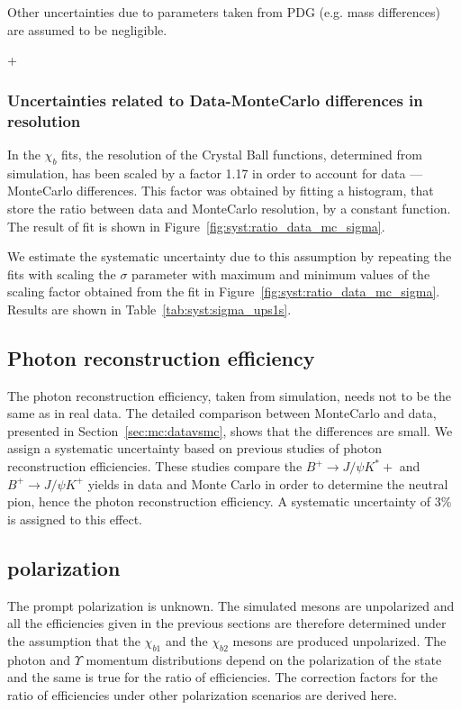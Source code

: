  Other uncertainties due to parameters taken from PDG (e.g. mass differences)
 are assumed to be negligible.
 
+\subsubsection{Uncertainties related to Data-MonteCarlo differences in resolution}
 
In the $\chi_b$ fits, the resolution of the Crystal Ball functions, determined
from simulation, has been scaled by a factor 1.17 in order to account for data
--- MonteCarlo differences. This factor was obtained by fitting a histogram,
that store the ratio between data and MonteCarlo resolution, by a constant
function. The result of fit is shown in
Figure~\ref{fig:syst:ratio_data_mc_sigma}.
 
% 


We estimate the systematic uncertainty due to this assumption by repeating the
fits with scaling the $\sigma$ parameter with maximum and minimum values of
the scaling factor obtained from the fit in Figure~\ref{fig:syst:ratio_data_mc_sigma}.
Results are shown in Table~\ref{tab:syst:sigma_ups1s}.



\subsection{Photon reconstruction efficiency}
The photon reconstruction efficiency, taken from simulation, needs not to be
the same as in real data. The detailed comparison between MonteCarlo and data,
presented in Section~\ref{sec:mc:datavsmc}, shows that the differences
are small. We assign a systematic uncertainty based on previous studies of
photon reconstruction efficiencies. These studies compare the $B^+ \rightarrow
J/\psi K^*+$ and $B^+ \rightarrow J/\psi K^+$ yields in data and Monte Carlo in
order to determine the neutral pion, hence the photon  reconstruction
efficiency. A systematic uncertainty of 3\% is assigned to this effect.






\subsection{\chib polarization}
\label{sec:syst:pol}

The prompt \chib polarization is unknown. The simulated \chib mesons are
unpolarized and all the efficiencies given in the previous sections are
therefore determined under the assumption that the $\chi_{b1}$ and the
$\chi_{b2}$ mesons are produced unpolarized. The photon and $\Upsilon$ momentum
distributions depend on the polarization of the \chib state and the same is
true for the ratio of efficiencies. The correction factors for the ratio of
efficiencies under other polarization scenarios are derived here.

